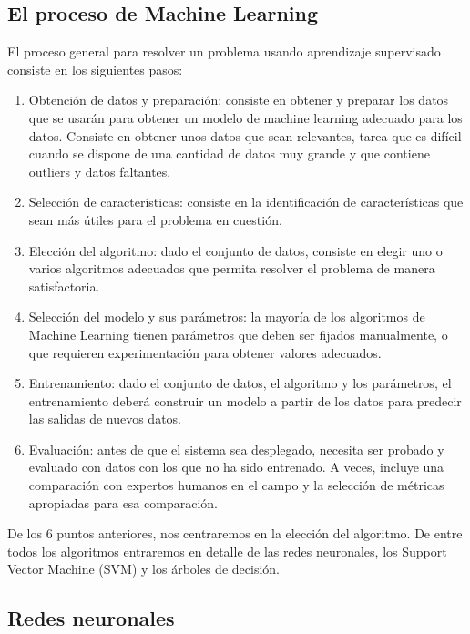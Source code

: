\subsection{El proceso de Machine Learning}

El proceso general para resolver un problema usando aprendizaje supervisado consiste en los siguientes pasos:

\begin{enumerate}
	\item Obtención de datos y preparación: consiste en obtener y preparar los datos que se usarán para obtener un modelo de machine learning adecuado para los datos. Consiste en obtener unos datos que sean relevantes, tarea que es difícil cuando se dispone de una cantidad de datos muy grande y que contiene outliers y datos faltantes.
	
	\item Selección de características: consiste en la identificación de características que sean más útiles para el problema en cuestión.
	
	\item Elección del algoritmo: dado el conjunto de datos, consiste en elegir uno o varios algoritmos adecuados que permita resolver el problema de manera satisfactoria.
	
	\item Selección del modelo y sus parámetros: la mayoría de los algoritmos de Machine Learning tienen parámetros que deben ser fijados manualmente, o que requieren experimentación para obtener valores adecuados.
	
	\item Entrenamiento: dado el conjunto de datos, el algoritmo y los parámetros, el entrenamiento deberá construir un modelo a partir de los datos para predecir las salidas de nuevos datos.
	
	\item Evaluación: antes de que el sistema sea desplegado, necesita ser probado y evaluado con datos con los que no ha sido entrenado. A veces, incluye una comparación con expertos humanos en el campo y la selección de métricas apropiadas para esa comparación.    
\end{enumerate}

De los 6 puntos anteriores, nos centraremos en la elección del algoritmo. De entre todos los algoritmos entraremos en detalle de las redes neuronales, los Support Vector Machine (SVM) y los árboles de decisión. 

\subsection{Redes neuronales}

